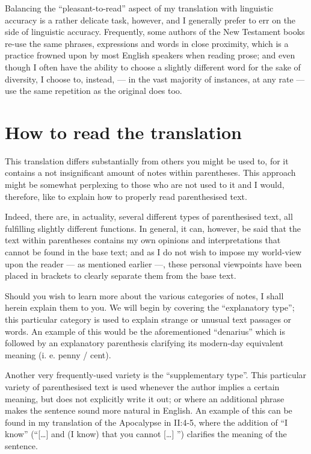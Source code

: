 Balancing the ``pleasant-to-read'' aspect of my translation with linguistic accuracy is a rather delicate task, however, and I generally prefer to err on the side of linguistic accuracy. Frequently, some authors of the New Testament books re-use the same phrases, expressions and words in close proximity, which is a practice frowned upon by most English speakers when reading prose; and even though I often have the ability to choose a slightly different word for the sake of diversity, I choose to, instead, — in the vast majority of instances, at any rate — use the same repetition as the original does too. 

\section*{How to read the translation}
  
This translation differs substantially from others you might be used to, for it contains a not insignificant amount of notes within parentheses. This approach might be somewhat perplexing to those who are not used to it and I would, therefore, like to explain how to properly read parenthesised text.  

Indeed, there are, in actuality, several different types of parenthesised text, all fulfilling slightly different functions. In general, it can, however, be said that the text within parentheses contains my own opinions and interpretations that cannot be found in the base text; and as I do not wish to impose my world-view upon the reader — as mentioned earlier —, these personal viewpoints have been placed in brackets to clearly separate them from the base text. 

Should you wish to learn more about the various categories of notes, I shall herein explain them to you. We will begin by covering the ``explanatory type''; this particular category is used to explain strange or unusual text passages or words. An example of this would be the aforementioned ``denarius'' which is followed by an explanatory parenthesis clarifying its modern-day equivalent meaning (i. e. penny / cent). 

Another very frequently-used variety is the ``supplementary type''. This particular variety of parenthesised text is used whenever the author implies a certain meaning, but does not explicitly write it out; or where an additional phrase makes the sentence sound more natural in English. An example of this can be found in my translation of the Apocalypse in II:4-5, where the addition of ``I know'' (``[…] and (I know) that you cannot […] '') clarifies the meaning of the sentence. 

